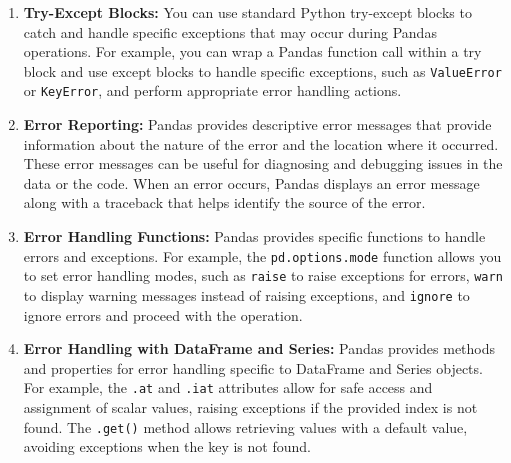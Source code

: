 \begin{enumerate}
	\item \textbf{Try-Except Blocks:} You can use standard Python try-except blocks to catch and handle specific exceptions that may occur during Pandas operations. For example, you can wrap a Pandas function call within a try block and use except blocks to handle specific exceptions, such as \texttt{ValueError} or \texttt{KeyError}, and perform appropriate error handling actions.
	
	\begin{code}[h!]
		    
		
		\caption{Try Except Blocks}
		
	\end{code}
	
	\item \textbf{Error Reporting:} Pandas provides descriptive error messages that provide information about the nature of the error and the location where it occurred. These error messages can be useful for diagnosing and debugging issues in the data or the code. When an error occurs, Pandas displays an error message along with a traceback that helps identify the source of the error.
	
	\item \textbf{Error Handling Functions:} Pandas provides specific functions to handle errors and exceptions. For example, the \texttt{pd.options.mode} function allows you to set error handling modes, such as \texttt{raise} to raise exceptions for errors, \texttt{warn} to display warning messages instead of raising exceptions, and \texttt{ignore} to ignore errors and proceed with the operation.
	
	\begin{code}[h!]
		    
		
		\caption{Error Handling Functions}
		
	\end{code}
	
	\item \textbf{Error Handling with DataFrame and Series:} Pandas provides methods and properties for error handling specific to DataFrame and Series objects. For example, the \texttt{.at} and \texttt{.iat} attributes allow for safe access and assignment of scalar values, raising exceptions if the provided index is not found. The \texttt{.get()} method allows retrieving values with a default value, avoiding exceptions when the key is not found.
	
	\begin{code}[h!]
		    
		
		\caption{Error Handling with DataFrame and Series}
		
	\end{code}
	
\end{enumerate}


